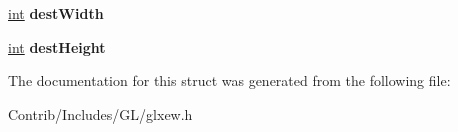 \begin{DoxyCompactItemize}
\item 
\hyperlink{_s_d_l__thread_8h_a6a64f9be4433e4de6e2f2f548cf3c08e}{int} {\bfseries dest\+Width}\hypertarget{struct_g_l_x_pipe_rect_ae8783831528e5bd731f6f57b595a2075}{}\label{struct_g_l_x_pipe_rect_ae8783831528e5bd731f6f57b595a2075}

\item 
\hyperlink{_s_d_l__thread_8h_a6a64f9be4433e4de6e2f2f548cf3c08e}{int} {\bfseries dest\+Height}\hypertarget{struct_g_l_x_pipe_rect_add482a142c429d0587e2619db57d9194}{}\label{struct_g_l_x_pipe_rect_add482a142c429d0587e2619db57d9194}

\end{DoxyCompactItemize}


The documentation for this struct was generated from the following file\+:\begin{DoxyCompactItemize}
\item 
Contrib/\+Includes/\+G\+L/glxew.\+h\end{DoxyCompactItemize}
